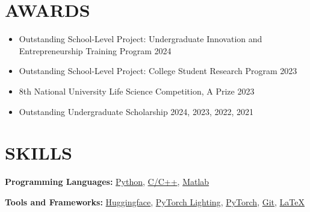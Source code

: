 \documentclass{resume}
\begin{document}

\section{AWARDS}
\begin{itemize}
	\item Outstanding School-Level Project: Undergraduate Innovation and Entrepreneurship Training Program \hfill 2024
	\item Outstanding School-Level Project: College Student Research Program \hfill 2023
	\item 8th National University Life Science Competition, A Prize \hfill 2023
	\item Outstanding Undergraduate Scholarship \hfill 2024, 2023, 2022, 2021
\end{itemize}


\section{SKILLS}
\textbf{Programming Languages:} \href{https://www.python.org/}{Python}, \href{https://isocpp.org/}{C/C++}, \href{https://ww2.mathworks.cn/products/matlab.html}{Matlab}

\textbf{Tools and Frameworks:} \href{https://huggingface.co/}{Huggingface}, \href{https://lightning.ai/docs/pytorch/stable/}{PyTorch Lighting}, \href{https://pytorch.org/}{PyTorch}, \href{https://git-scm.com/}{Git}, \href{https://www.latex-project.org/}{\LaTeX}
\end{document}
